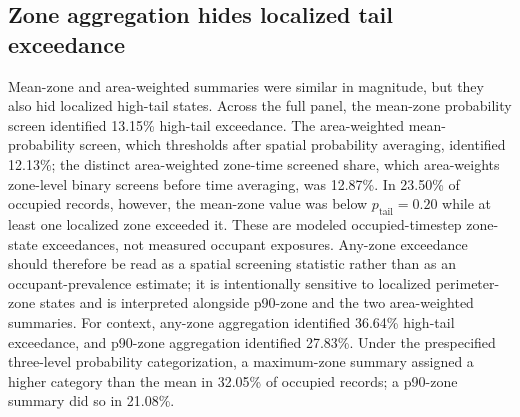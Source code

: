 \begin{table}[htbp]
\centering
\caption{Held-out TSV class validation for the primary predictor, the no-PMV robustness predictor, and a rounded-PMV class baseline. The PMV baseline rounds PMV to the nearest TSV class and clips to $[-3,+3]$; it is a deterministic scalar-label baseline, not a probability model. Argmax-tail F1 converts each probability vector to its most probable class before grouping classes by tail status; it is distinct from F1 at the probability screen reported in Table~\ref{tab:tail_probability_comparison}. Class recall columns report the share of records in each observed TSV class assigned to that same class.}
\label{tab:tsv_predictor_validation}
\scriptsize
{}
\end{table}

\subsection{Zone aggregation hides localized tail exceedance}

Mean-zone and area-weighted summaries were similar in magnitude, but they also hid localized high-tail states. Across the full panel, the mean-zone probability screen identified 13.15\% high-tail exceedance. The area-weighted mean-probability screen, which thresholds after spatial probability averaging, identified 12.13\%; the distinct area-weighted zone-time screened share, which area-weights zone-level binary screens before time averaging, was 12.87\%. In 23.50\% of occupied records, however, the mean-zone value was below $p_{\mathrm{tail}}=0.20$ while at least one localized zone exceeded it. These are modeled occupied-timestep zone-state exceedances, not measured occupant exposures. Any-zone exceedance should therefore be read as a spatial screening statistic rather than as an occupant-prevalence estimate; it is intentionally sensitive to localized perimeter-zone states and is interpreted alongside p90-zone and the two area-weighted summaries. For context, any-zone aggregation identified 36.64\% high-tail exceedance, and p90-zone aggregation identified 27.83\%. Under the prespecified three-level probability categorization, a maximum-zone summary assigned a higher category than the mean in 32.05\% of occupied records; a p90-zone summary did so in 21.08\%.

